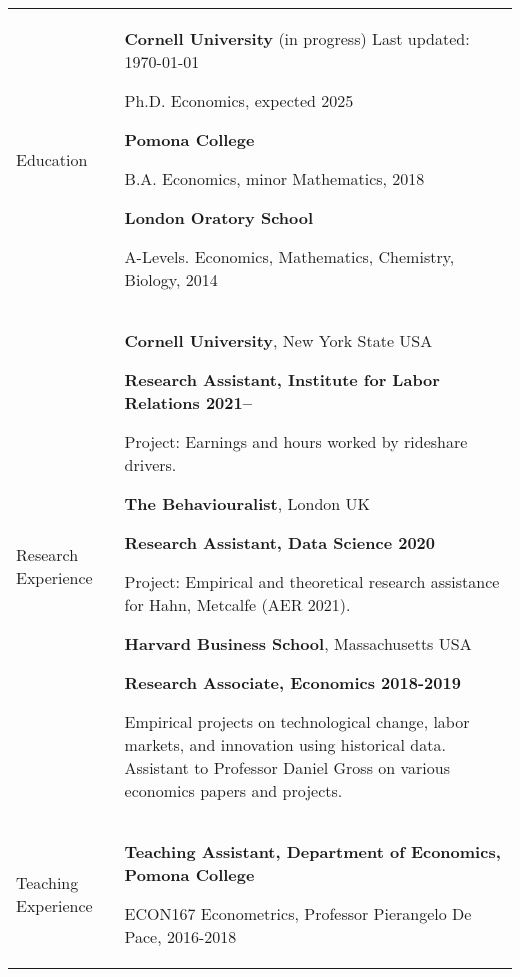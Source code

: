 \documentclass[letterpaper,11pt,oneside]{article}
\begin{document}
\noindent
\begin{tabular}[\textwidth]{p{} p{}}
    \Large{Education}
    & \textbf{Cornell University} (in progress)  \hfill Last updated: \today

    Ph.D. Economics, expected 2025 \vspace{0.1cm}
    
    \textbf{Pomona College}

    B.A. Economics, minor Mathematics, 2018 \vspace{0.1cm}
    
    \textbf{London Oratory School}
    
    A-Levels. Economics, Mathematics, Chemistry, Biology, 2014 \vspace{0.2cm} \\
    
\Large{Research Experience}
    & \textbf{Cornell University}, New York State USA 
    
    \textbf{Research Assistant, Institute for Labor Relations 2021--}

    Project: Earnings and hours worked by rideshare drivers.
    \vspace{0.2cm}
    
    \textbf{The Behaviouralist}, London UK
    
    \textbf{Research Assistant, Data Science 2020}
    
    Project: Empirical and theoretical research assistance for Hahn, Metcalfe (AER 2021).
    \vspace{0.2cm}

    \textbf{Harvard Business School}, Massachusetts USA
    
    \textbf{Research Associate, Economics 2018-2019}
    
    Empirical projects on technological change, labor markets, and innovation using historical data.
    Assistant to Professor Daniel Gross on various economics papers and projects.
    \vspace{0.2cm} \\

\Large{Teaching Experience}
    & \textbf{Teaching Assistant, Department of Economics, Pomona College}
    
    ECON167 Econometrics, Professor Pierangelo De Pace, 2016-2018


\end{tabular}
\end{document}
